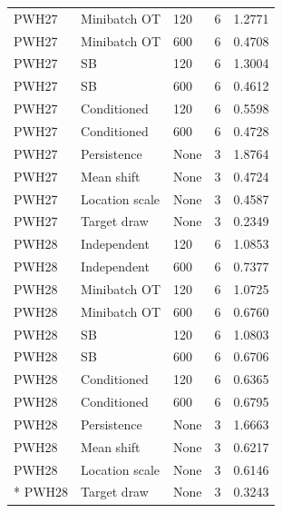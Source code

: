 \documentclass[10pt,a4paper]{article}
\begin{document}
{{\begin{longtable}{@{}p{30mm}p{48mm}p{23mm}p{25mm}p{36mm}@{}}
PWH27 & Minibatch OT & 120 & 6 & 1.2771 \\
PWH27 & Minibatch OT & 600 & 6 & 0.4708 \\
PWH27 & SB & 120 & 6 & 1.3004 \\
PWH27 & SB & 600 & 6 & 0.4612 \\
PWH27 & Conditioned & 120 & 6 & 0.5598 \\
PWH27 & Conditioned & 600 & 6 & 0.4728 \\
PWH27 & Persistence & None & 3 & 1.8764 \\
PWH27 & Mean shift & None & 3 & 0.4724 \\
PWH27 & Location scale & None & 3 & 0.4587 \\
PWH27 & Target draw & None & 3 & 0.2349 \\
PWH28 & Independent & 120 & 6 & 1.0853 \\
PWH28 & Independent & 600 & 6 & 0.7377 \\
PWH28 & Minibatch OT & 120 & 6 & 1.0725 \\
PWH28 & Minibatch OT & 600 & 6 & 0.6760 \\
PWH28 & SB & 120 & 6 & 1.0803 \\
PWH28 & SB & 600 & 6 & 0.6706 \\
PWH28 & Conditioned & 120 & 6 & 0.6365 \\
PWH28 & Conditioned & 600 & 6 & 0.6795 \\
PWH28 & Persistence & None & 3 & 1.6663 \\
PWH28 & Mean shift & None & 3 & 0.6217 \\
PWH28 & Location scale & None & 3 & 0.6146 \\*
PWH28 & Target draw & None & 3 & 0.3243 \\
\end{longtable}
}
}
\end{document}
